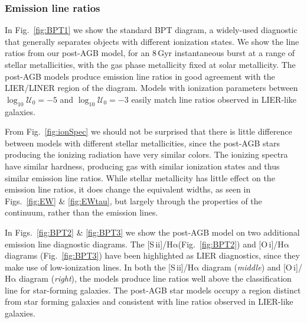 \documentclass[preprint2]{aastex62}
\newcommand{\sii}{[S\,{\sc ii}]\xspace}
\newcommand{\oi}{[O\,{\sc i}]\xspace}
\newcommand{\ha}{\ensuremath{\mathrm{H\alpha}}\xspace}
\newcommand{\logten}{\ensuremath{\log_{10}}}
\newcommand{\logUeq}[1]{\ensuremath{\logten \mathcal{U}_0 = #1}}
\newcommand{\Gyr}{$\,$Gyr\xspace}
\begin{document}
\subsubsection{Emission line ratios} \label{sec:stars:ratios}

In Fig.~\ref{fig:BPT1} we show the standard BPT diagram, a widely-used diagnostic that generally separates objects with different ionization states. We show the line ratios from our post-AGB model, for an 8\Gyr instantaneous burst at a range of stellar metallicities, with the gas phase metallicity fixed at solar metallicity. The post-AGB models produce emission line ratios in good agreement with the LIER/LINER region of the diagram. Models with ionization parameters between \logUeq{-5} and \logUeq{-3} easily match line ratios observed in LIER-like galaxies.

From Fig.~\ref{fig:ionSpec} we should not be surprised that there is little difference between models with different stellar metallicities, since the post-AGB stars producing the ionizing radiation have very similar colors. The ionizing spectra have similar hardness, producing gas with similar ionization states and thus similar emission line ratios. While stellar metallicity has little effect on the emission line ratios, it does change the equivalent widths, as seen in Figs.~\ref{fig:EW} \& \ref{fig:EWtau}, but largely through the properties of the continuum, rather than the emission lines.

In Figs.~\ref{fig:BPT2} \& \ref{fig:BPT3} we show the post-AGB model on two additional emission line diagnostic diagrams. The \sii/\ha (Fig.~\ref{fig:BPT2}) and \oi/\ha diagrams (Fig.~\ref{fig:BPT3}) have been highlighted as LIER diagnostics, since they make use of low-ionization lines. In both the \sii/\ha diagram (\emph{middle}) and \oi/\ha diagram (\emph{right}), the models produce line ratios well above the \citet{Kewley+2006} classification line for star-forming galaxies. The post-AGB star models occupy a region distinct from star forming galaxies and consistent with line ratios observed in LIER-like galaxies.

\end{document}
